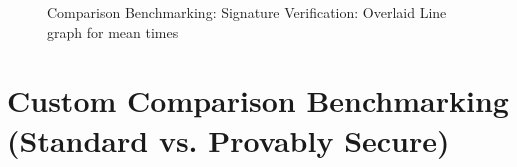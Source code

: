 \documentclass[]{final_report}
\begin{document}
\begin{figure}[H]
\begin{minipage}{0.7\textwidth}
        \label{fig:image2} 
    \end{minipage}
     \begin{minipage}{0.7\textwidth}
        \centering
       \caption{Comparison Benchmarking: Signature Verification: Overlaid Line graph for mean times}
        \label{fig:image2}
    \end{minipage}
\end{figure}


\chapter{Custom Comparison Benchmarking (Standard vs. Provably Secure)}
\end{document}
